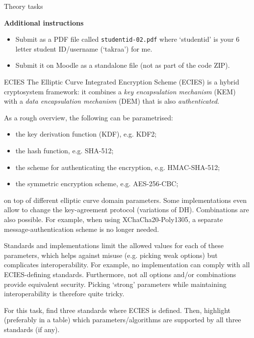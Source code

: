\documentclass{homework}
\begin{document}
\newpage

\begin{center}
  Theory tasks
\end{center}

\textbf{Additional instructions}

\begin{itemize}
  \item Submit as a PDF file called \texttt{studentid-02.pdf} where `studentid' is your 6 letter student ID/username (`takraa') for me.
  \item Submit it on Moodle as a standalone file (not as part of the code ZIP).
\end{itemize}

\begin{task}{ECIES}
  The Elliptic Curve Integrated Encryption Scheme (ECIES) is a hybrid cryptosystem framework: it combines a \emph{key encapsulation mechanism} (KEM) with a \emph{data encapsulation mechanism} (DEM) that is also \emph{authenticated}.

  As a rough overview, the following can be parametrised:
  \begin{itemize}
    \item the key derivation function (KDF), e.g. KDF2;
    \item the hash function, e.g. SHA-512;
    \item the scheme for authenticating the encryption, e.g. HMAC-SHA-512;
    \item the symmetric encryption scheme, e.g. AES-256-CBC;
  \end{itemize}
  on top of different elliptic curve domain parameters.
  Some implementations even allow to change the key-agreement protocol (variations of DH).
  Combinations are also possible.
  For example, when using XChaCha20-Poly1305, a separate message-authentication scheme is no longer needed.

  Standards and implementations limit the allowed values for each of these parameters, which helps against misuse (e.g. picking weak options) but complicates interoperability.
  For example, no implementation can comply with all ECIES-defining standards.
  Furthermore, not all options and/or combinations provide equivalent security.
  Picking `strong' parameters while maintaining interoperability is therefore quite tricky. 

  For this task, find three standards where ECIES is defined.
  Then, highlight (preferably in a table) which parameters/algorithms are supported by all three standards (if any).
\end{task}
\end{document}
